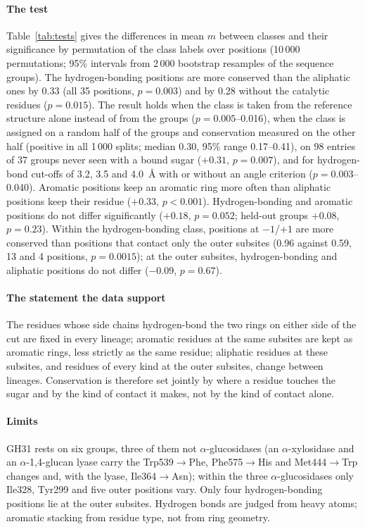 \documentclass[preprint,12pt]{elsarticle}
\begin{document}
\paragraph{The test} Table~\ref{tab:tests} gives the differences in mean $m$ between classes
and their significance by permutation of the class labels over positions (10\,000
permutations; 95\% intervals from 2\,000 bootstrap resamples of the sequence groups). The
hydrogen-bonding positions are more conserved than the aliphatic ones by 0.33 (all 35
positions, $p = 0.003$) and by 0.28 without the catalytic residues ($p = 0.015$). The result
holds when the class is taken from the reference structure alone instead of from the groups
($p = 0.005$--0.016), when the class is assigned on a random half of the groups and conservation
measured on the other half (positive in all 1\,000 splits; median 0.30, 95\% range
0.17--0.41), on 98 entries of 37 groups never seen with a bound sugar ($+0.31$, $p = 0.007$),
and for hydrogen-bond cut-offs of 3.2, 3.5 and 4.0~\AA{} with or without an angle criterion
($p = 0.003$--0.040). Aromatic positions keep an aromatic ring more often than aliphatic
positions keep their residue ($+0.33$, $p < 0.001$). Hydrogen-bonding and aromatic positions do
not differ significantly ($+0.18$, $p = 0.052$; held-out groups $+0.08$, $p = 0.23$). Within the
hydrogen-bonding class, positions at $-1$/$+1$ are more conserved than positions that contact
only the outer subsites (0.96 against 0.59, 13 and 4 positions, $p = 0.0015$); at the outer
subsites, hydrogen-bonding and aliphatic positions do not differ ($-0.09$, $p = 0.67$).

\paragraph{The statement the data support} The residues whose side chains hydrogen-bond the two
rings on either side of the cut are fixed in every lineage; aromatic residues at the same
subsites are kept as aromatic rings, less strictly as the same residue; aliphatic residues at
these subsites, and residues of every kind at the outer subsites, change between lineages.
Conservation is therefore set jointly by where a residue touches the sugar and by the kind of
contact it makes, not by the kind of contact alone.

\paragraph{Limits} GH31 rests on six groups, three of them not $\alpha$-glucosidases (an
$\alpha$-xylosidase and an $\alpha$-1,4-glucan lyase carry the Trp539$\to$Phe, Phe575$\to$His
and Met444$\to$Trp changes and, with the lyase, Ile364$\to$Asn); within the three
$\alpha$-glucosidases only Ile328, Tyr299 and five outer positions vary. Only four
hydrogen-bonding positions lie at the outer subsites. Hydrogen bonds are judged from heavy
atoms; aromatic stacking from residue type, not from ring geometry.
\end{document}
